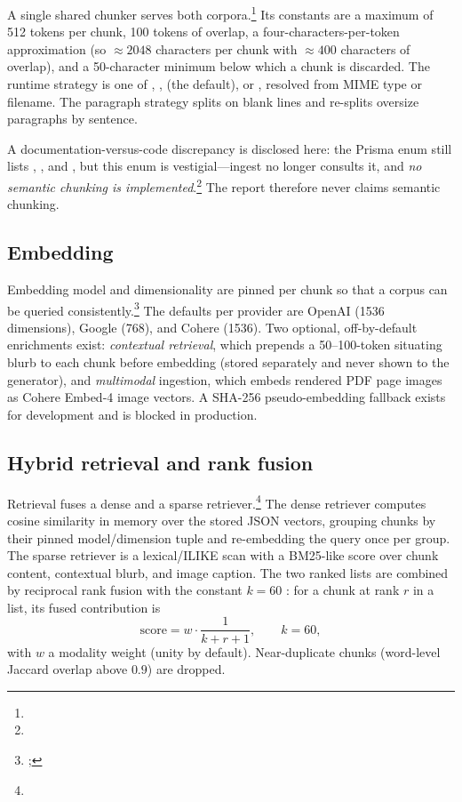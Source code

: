 A single shared chunker serves both
corpora.\footnote{} Its
constants are a maximum of 512 tokens per chunk, 100 tokens of overlap, a
four-characters-per-token approximation (so $\approx 2048$ characters per
chunk with $\approx 400$ characters of overlap), and a 50-character
minimum below which a chunk is discarded. The runtime strategy is one of
, ,  (the default), or
, resolved from MIME type or filename. The paragraph strategy
splits on blank lines and re-splits oversize paragraphs by sentence.

A documentation-versus-code discrepancy is disclosed here: the Prisma
enum  still lists ,
, and , but this enum is vestigial---ingest
no longer consults it, and \emph{no semantic chunking is
implemented}.\footnote{}
The report therefore never claims semantic chunking.

\subsection{Embedding}
\label{sec:modes-embedding}

Embedding model and dimensionality are pinned per chunk so that a corpus
can be queried consistently.\footnote{;
} The defaults per provider are
OpenAI  (1536 dimensions), Google
 (768), and Cohere  (1536).
Two optional, off-by-default enrichments exist: \emph{contextual
retrieval}, which prepends a 50--100-token situating blurb to each chunk
before embedding (stored separately and never shown to the generator),
and \emph{multimodal} ingestion, which embeds rendered PDF page images as
Cohere Embed-4 image vectors. A SHA-256 pseudo-embedding fallback exists
for development and is blocked in production.

\subsection{Hybrid retrieval and rank fusion}
\label{sec:modes-retrieval}

Retrieval fuses a dense and a sparse
retriever.\footnote{}
The dense retriever computes cosine similarity in memory over the stored
JSON vectors, grouping chunks by their pinned model/dimension tuple and
re-embedding the query once per group. The sparse retriever is a
lexical/ILIKE scan with a BM25-like score over chunk content, contextual
blurb, and image caption. The two ranked lists are combined by reciprocal
rank fusion with the constant $k=60$ \citep{cormack2009rrf}: for a chunk
at rank $r$ in a list, its fused contribution is
\begin{equation}
  \text{score} = w \cdot \frac{1}{k + r + 1}, \qquad k = 60,
\end{equation}
with $w$ a modality weight (unity by default). Near-duplicate chunks
(word-level Jaccard overlap above $0.9$) are dropped.

